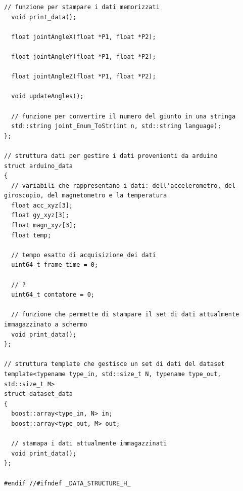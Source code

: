 \documentclass[10pt,a4paper]{article}
\begin{document}
\begin{lstlisting}[style=mycpp, caption=librerie usate, captionpos=b]
  // funzione per stampare i dati memorizzati
  void print_data();

  float jointAngleX(float *P1, float *P2);

  float jointAngleY(float *P1, float *P2);

  float jointAngleZ(float *P1, float *P2);

  void updateAngles();

  // funzione per convertire il numero del giunto in una stringa
  std::string joint_Enum_ToStr(int n, std::string language);
};

// struttura dati per gestire i dati provenienti da arduino
struct arduino_data
{
  // variabili che rappresentano i dati: dell'accelerometro, del giroscopio, del magnetometro e la temperatura
  float acc_xyz[3];
  float gy_xyz[3];
  float magn_xyz[3];
  float temp;

  // tempo esatto di acquisizione dei dati
  uint64_t frame_time = 0;

  // ?
  uint64_t contatore = 0;

  // funzione che permette di stampare il set di dati attualmente immagazzinato a schermo 
  void print_data();
};

// struttura template che gestisce un set di dati del dataset
template<typename type_in, std::size_t N, typename type_out, std::size_t M>
struct dataset_data
{
  boost::array<type_in, N> in;
  boost::array<type_out, M> out;

  // stamapa i dati attualmente immagazzinati
  void print_data();
};

#endif //#ifndef _DATA_STRUCTURE_H_
\end{lstlisting}
%
%
\end{document}
